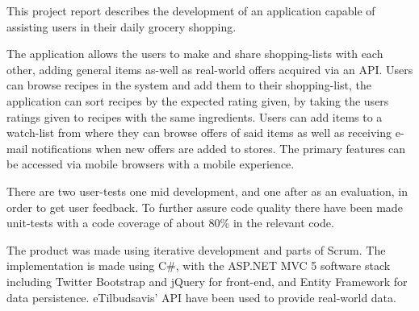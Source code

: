 
%
%
%
%
This project report describes the development of an application capable of assisting users in their daily grocery shopping. 

The application allows the users to make and share shopping-lists with each other, adding general items as-well as real-world offers acquired via an API.
Users can browse recipes in the system and add them to their shopping-list, the application can sort recipes by the expected rating given, by taking the users ratings given to recipes with the same ingredients.
Users can add items to a watch-list from where they can browse offers of said items as well as receiving e-mail notifications when new offers are added to stores. 
The primary features can be accessed via mobile browsers with a mobile experience. 

There are two user-tests one mid development, and one after as an evaluation, in order to get user feedback.
To further assure code quality there have been made unit-tests with a code coverage of about 80\% in the relevant code. 

The product was made using iterative development and parts of Scrum.
The implementation is made using C\#, with the ASP.NET MVC 5 software stack including Twitter Bootstrap and jQuery for front-end, and Entity Framework for data persistence. 
eTilbudsavis' API have been used to provide real-world data.
